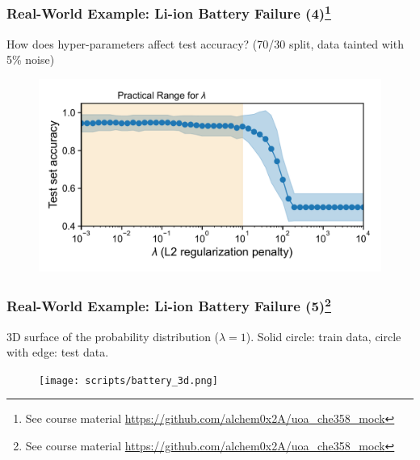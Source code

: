 \documentclass[10pt,aspectratio=169]{beamer}
\begin{document}
      \begin{frame}
        \frametitle{Real-World Example: Li-ion Battery Failure
          (4)\let\thefootnote\relax\footnote{{\scriptsize See course
              material
              \url{https://github.com/alchem0x2A/uoa_che358_mock}}}}

        How does hyper-parameters affect test accuracy? (70/30 split,
        data tainted with 5\% noise)

        \begin{figure}
          \vspace*{-0.05\textheight}%
          \includegraphics[width=\textwidth]{scripts/batter_hyper.pdf}
        \end{figure}
        
        
      \end{frame}

      \begin{frame}
        \frametitle{Real-World Example: Li-ion Battery Failure
          (5)\let\thefootnote\relax\footnote{{\scriptsize See course
              material
              \url{https://github.com/alchem0x2A/uoa_che358_mock}}}}

        3D surface of the probability distribution ($\lambda =
        1$). Solid circle: train data, circle with edge: test data.

        \begin{figure}
          \vspace*{-0.15\textheight}%
          \texttt{[image: scripts/battery\_3d.png]}
        \end{figure}
        
        
      \end{frame}
\end{document}
